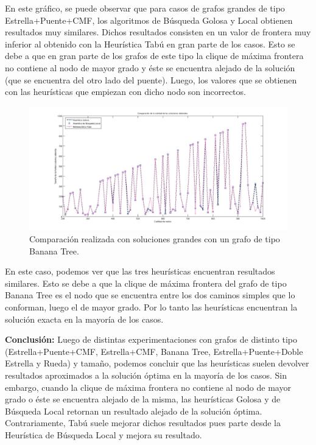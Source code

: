En este gráfico, se puede observar que para casos de grafos grandes de tipo Estrella+Puente+CMF, los algoritmos de Búsqueda Golosa y Local obtienen resultados muy similares. Dichos resultados consisten en un valor de frontera muy inferior al obtenido con la Heurística Tabú en gran parte de los casos. Esto se debe a que en gran parte de los grafos de este tipo la clique de máxima frontera no contiene al nodo de mayor grado y éste se encuentra alejado de la solución (que se encuentra del otro lado del puente). Luego, los valores que se obtienen con las heurísticas que empiezan con dicho nodo son incorrectos.

 \begin{figure}[H] %
\begin{center}
\includegraphics[width=500pt]{../imgs/calidadSolucionesGrandes3.jpg}
\caption{Comparación realizada con soluciones grandes con un grafo de tipo Banana Tree.}
\end{center}
\end{figure}

En este caso, podemos ver que las tres heurísticas encuentran resultados similares. Esto se debe a que la clique de máxima frontera del grafo de tipo Banana Tree es el nodo que se encuentra entre los dos caminos simples que lo conforman, luego el de mayor grado. Por lo tanto las heurísticas encuentran la solución exacta en la mayoría de los casos.


\textbf{Conclusión:} Luego de distintas experimentaciones con grafos de distinto tipo (Estrella+Puente+CMF, Estrella+CMF, Banana Tree, Estrella+Puente+Doble Estrella y Rueda) y tamaño, podemos concluir que las heurísticas suelen devolver resultados aproximados a la solución óptima en la mayoría de los casos. Sin embargo, cuando la clique de máxima frontera no contiene al nodo de mayor grado o éste se encuentra alejado de la misma, las heurísticas Golosa y de Búsqueda Local retornan un resultado alejado de la solución óptima. Contrariamente, Tabú suele mejorar dichos resultados pues parte desde la Heurística de Búsqueda Local y mejora su resultado.